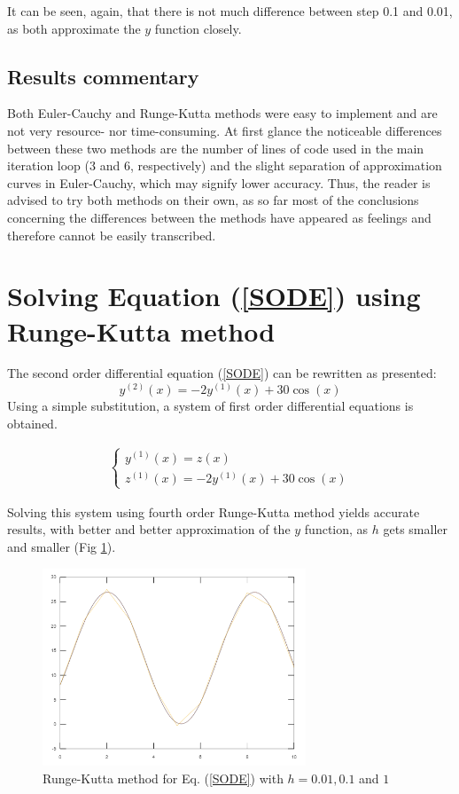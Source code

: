 \documentclass[a4paper,12pt]{article}
\begin{document}
It can be seen, again, that there is not much difference between step 0.1 and 0.01, as both approximate the $y$ function closely.

\subsection{Results commentary}

Both Euler-Cauchy and Runge-Kutta methods were easy to implement and are not very resource- nor time-consuming. At first glance the noticeable differences between these two methods are the number of lines of code used in the main iteration loop (3 and 6, respectively) and the slight separation of approximation curves in Euler-Cauchy, which may signify lower accuracy. Thus, the reader is advised to try both methods on their own, as so far most of the conclusions concerning the differences between the methods have appeared as feelings and therefore cannot be easily transcribed.

\section{Solving Equation (\ref{SODE}) using Runge-Kutta method}
The second order differential equation (\ref{SODE}) can be rewritten as presented:
\begin{equation}
    y^{(2)}(x) = -2y^{(1)}(x) + 30\cos(x)
\end{equation}
\clearpage
Using a simple substitution, a system of first order differential equations is obtained.

\begin{gather}
    \begin{cases}
    y^{(1)}(x) = z(x) \\ z^{(1)}(x) = -2y^{(1)}(x) + 30\cos(x)
    \end{cases}
\end{gather}

Solving this system using fourth order Runge-Kutta method yields accurate results, with better and better approximation of the $y$ function, as $h$ gets smaller and smaller (Fig \ref{fig:runge_kutta_sode}).

\begin{figure}[H]
    \centering
    \includegraphics[width=0.7\textwidth]{runge_kutta_sode.png}
    \caption{Runge-Kutta method for Eq. (\ref{SODE}) with $h = 0.01, 0.1$ and $1$}
    \label{fig:runge_kutta_sode}
\end{figure}
\end{document}
